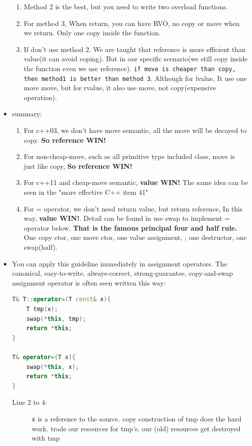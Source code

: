 \documentclass[a4paper,11pt,twoside]{book}
\begin{document}
\begin{itemize}
\begin{enumerate}
	\item Method 2 is the best, but you need to write two overload functions.
	
	\item For method 3, When return, you can have RVO, no copy or move when we return. Only one copy inside the function.
	
	\item If don’t use method 2.  We are taught that reference is more efficient than value(it can avoid coping). But in our specific scenario(we still copy inside the function even we use reference). \texttt{if move is cheaper than copy, then method1 is better than method 3}. Although for lvalue, It use one more move, but for rvalue, it also use move, not copy(expensive operation).
	  
\end{enumerate}


\item summary:
\begin{enumerate}
	\item For c++03, we don't have move semantic, all the move will be decayed to copy. \textbf{So reference WIN!}
	
	\item For non-cheap-move, such as all primitive type included class, move is just like copy, \textbf{So reference WIN!}
	
	\item For c++11 and cheap-move semantic, \textbf{value WIN!} The same idea can be seen in the "more effective C++ item 41" 
	
	\item For = operator, we don't need return value, but return reference, In this way, \textbf{value WIN!}. Detail can be found in use swap to implement = operator below. \textbf{That is the famous principal four and half rule.} One copy ctor, one move ctor, one value assignment, , one destructor, one swap(half).
	
\end{enumerate}

\item You can apply this guideline immediately in assignment operators. The canonical, easy-to-write, always-correct, strong-guarantee, copy-and-swap assignment operator is often seen written this way:
\begin{lstlisting}[frame=single, language=c++]
T& T::operator=(T const& x){ 
	T tmp(x);          
	swap(*this, tmp);  
	return *this;      
}

T& operator=(T x){ 
	swap(*this, x);
	return *this;   
}
\end{lstlisting}
\begin{description}
	\item[Line 2 to 4:] \texttt{x} is a reference to the source. copy construction of tmp does the hard work. trade our resources for tmp's. our (old) resources get destroyed with tmp 
	

\end{description}
\end{itemize}
\end{document}

